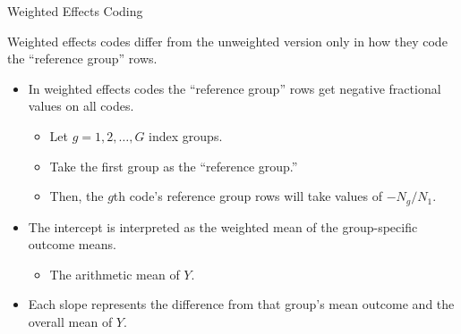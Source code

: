 \documentclass{beamer}\usepackage[]{graphicx}\usepackage[]{color}
\begin{document}
  
\begin{frame}{Weighted Effects Coding}
  
  Weighted effects codes differ from the unweighted version only in how they 
  code the ``reference group'' rows. 
  \vb
  \begin{itemize}
  \item In weighted effects codes the ``reference group'' rows get negative 
    fractional values on all codes.
    \vc
    \begin{itemize}
    \item Let $g = 1, 2, \ldots, G$ index groups.
    \item Take the first group as the ``reference group.'' 
    \item Then, the $g$th code's reference group rows will take values of 
      $-N_g/N_1$.
    \end{itemize}
    \vb
  \item The intercept is interpreted as the weighted mean of the group-specific 
    outcome means.
    \vc
    \begin{itemize}
    \item The arithmetic mean of $Y$.
    \end{itemize}
    \vc
  \item Each slope represents the difference from that group's mean outcome and 
    the overall mean of $Y$.
  \end{itemize}
  
\end{frame}

\watermarkoff %
\end{document}
